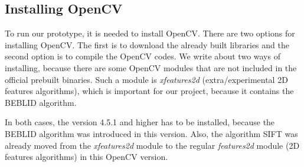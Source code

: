 \documentclass[thesis=B,english]{FITthesis}[2019/12/23]
\begin{document}
        \subsection{Installing OpenCV}
            To run our prototype, it is needed to install OpenCV. There are two options for installing OpenCV. The first is to download the already built libraries and the second option is to compile the OpenCV codes. We write about two ways of installing, because there are some OpenCV modules that are not included in the official prebuilt binaries. Such a module is \textit{xfeatures2d} (extra/experimental 2D features algorithms), which is important for our project, because it contains the BEBLID algorithm.
            
            In both cases, the version 4.5.1 and higher has to be installed, because the BEBLID algorithm was introduced in this version. Also, the algorithm SIFT was already moved from the \textit{xfeatures2d} module to the regular \textit{features2d} module (2D features algorithms) in this OpenCV version.
            
\end{document}
